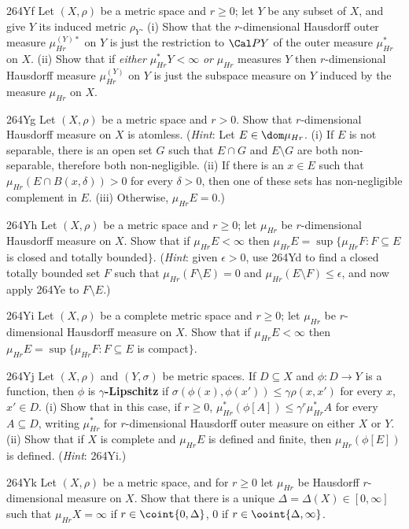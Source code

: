 {\spheader 264Yf Let $(X,\rho)$ be a metric space and $r\ge 0$;
let $Y$ be any subset of $X$, and give $Y$ its induced metric $\rho_Y$.
(i) Show that the $r$-dimensional Hausdorff outer measure
$\mu^{(Y)*}_{Hr}$ on $Y$ is just the restriction to $\Cal PY$ of the
outer measure $\mu_{Hr}^*$ on $X$.   (ii) Show that if {\it either}
$\mu_{Hr}^*Y<\infty$ {\it or} $\mu_{Hr}$ measures $Y$ then
$r$-dimensional Hausdorff measure $\mu^{(Y)}_{Hr}$ on
$Y$ is just the subspace measure on $Y$ induced by the measure
$\mu_{Hr}$ on $X$.

\spheader 264Yg Let $(X,\rho)$ be a metric space
and $r>0$.   Show that $r$-dimensional Hausdorff measure on $X$ is
atomless.   ({\it Hint\/}: Let $E\in\dom\mu_{Hr}$.   (i) If
$E$ is not separable, there is an open set $G$ such that $E\cap G$ and
$E\setminus G$ are both non-separable, therefore both non-negligible.
(ii) If there is an $x\in E$ such that $\mu_{Hr}(E\cap B(x,\delta))>0$
for
every $\delta>0$, then one of these sets has non-negligible complement
in
$E$.    (iii) Otherwise, $\mu_{Hr}E=0$.)

\spheader 264Yh  Let $(X,\rho)$ be a metric space and $r\ge 0$;
let $\mu_{Hr}$ be
$r$-dimensional Hausdorff measure on $X$.   Show that if
$\mu_{Hr}E<\infty$
then $\mu_{Hr}E=\sup\{\mu_{Hr}F:F\subseteq E$ is closed and totally
bounded$\}$.   ({\it Hint\/}: given $\epsilon>0$, use 264Yd to find a
closed totally bounded set $F$ such that $\mu_{Hr}(F\setminus E)=0$
and $\mu_{Hr}(E\setminus F)\le\epsilon$, and now apply 264Ye to
$F\setminus E$.)

\spheader 264Yi  Let $(X,\rho)$ be a complete metric space and $r\ge 0$;
let $\mu_{Hr}$ be
$r$-dimensional Hausdorff measure on $X$.   Show that if
$\mu_{Hr}E<\infty$
then $\mu_{Hr}E=\sup\{\mu_{Hr}F:F\subseteq E$ is compact$\}$.

\spheader 264Yj Let $(X,\rho)$ and $(Y,\sigma)$ be metric spaces.   If
$D\subseteq X$ and $\phi:D\to Y$ is a function, then $\phi$ is {\bf
$\gamma$-Lipschitz} if
$\sigma(\phi(x),\phi(x'))\le\gamma\rho(x,x')$ for every $x$, $x'\in D$.
(i) Show that in this case, if $r\ge 0$,
$\mu_{Hr}^*(\phi[A])\le\gamma^r\mu_{Hr}^*A$ for every $A\subseteq D$,
writing $\mu_{Hr}^*$ for $r$-dimensional Hausdorff outer measure on
either $X$ or $Y$.   (ii) Show that if $X$ is complete and $\mu_{Hr}E$
is defined
and finite, then $\mu_{Hr}(\phi[E])$ is defined.   ({\it Hint\/}:
264Yi.)

\spheader 264Yk Let $(X,\rho)$ be a metric space, and for $r\ge 0$ let
$\mu_{Hr}$ be Hausdorff $r$-dimensional measure on $X$.   Show that
there is a unique $\Delta=\Delta(X)\in[0,\infty]$ such that
$\mu_{Hr}X=\infty$ if
$r\in\coint{0,\Delta}$, $0$ if $r\in\ooint{\Delta,\infty}$.

}
